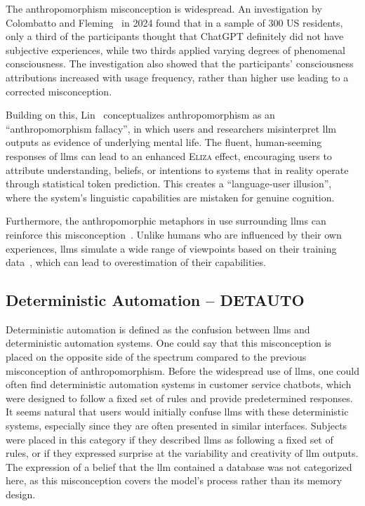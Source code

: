 The anthropomorphism misconception is widespread. An investigation by Colombatto and Fleming~\cite{colombatto_folk_2024} in 2024 found that in a sample of 300 US residents, only a third of the participants thought that ChatGPT definitely did not have subjective experiences, while two thirds applied varying degrees of phenomenal consciousness. The investigation also showed that the participants' consciousness attributions increased with usage frequency, rather than higher use leading to a corrected misconception.

Building on this, Lin~\cite{lin_six_2025} conceptualizes anthropomorphism as an ``anthropomorphism fallacy'', in which users and researchers misinterpret \gls{llm} outputs as evidence of underlying mental life. The fluent, human-seeming responses of \gls{llms} can lead to an enhanced \textsc{Eliza} effect, encouraging users to attribute understanding, beliefs, or intentions to systems that in reality operate through statistical token prediction. This creates a ``language-user illusion'', where the system's linguistic capabilities are mistaken for genuine cognition. 

Furthermore, the anthropomorphic metaphors in use surrounding \gls{llms} can reinforce this misconception~\cite{lin_six_2025}. Unlike humans who are influenced by their own experiences, \gls{llms} simulate a wide range of viewpoints based on their training data~\cite{lin_six_2025}, which can lead to overestimation of their capabilities.

\subsection{Deterministic Automation -- DETAUTO}\label{detauto}
Deterministic automation is defined as the confusion between \gls{llms} and deterministic automation systems. One could say that this misconception is placed on the opposite side of the spectrum compared to the previous misconception of anthropomorphism. Before the widespread use of \gls{llms}, one could often find deterministic automation systems in customer service chatbots, which were designed to follow a fixed set of rules and provide predetermined responses. It seems natural that users would initially confuse \gls{llms} with these deterministic systems, especially since they are often presented in similar interfaces. Subjects were placed in this category if they described \gls{llms} as following a fixed set of rules, or if they expressed surprise at the variability and creativity of \gls{llm} outputs. The expression of a belief that the \gls{llm} contained a database was not categorized here, as this misconception covers the model's process rather than its memory design.


